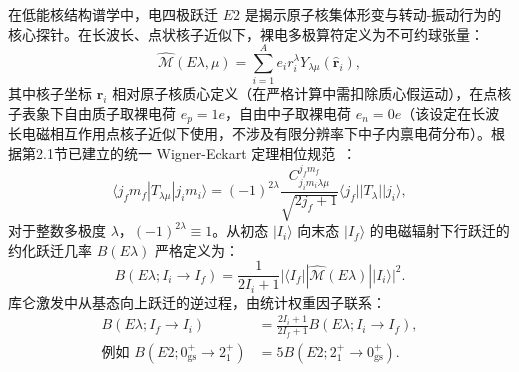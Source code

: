 在低能核结构谱学中，电四极跃迁 $E2$ 是揭示原子核集体形变与转动-振动行为的核心探针。在长波长、点状核子近似下，裸电多极算符定义为不可约球张量：
\begin{equation}\label{eq:2-7-bare-E-op}
\hat{\mathcal{M}}(E\lambda, \mu) = \sum_{i=1}^A e_i r_i^\lambda Y_{\lambda\mu}(\hat{\mathbf{r}}_i),
\end{equation}
其中核子坐标 $\mathbf{r}_i$ 相对原子核质心定义（在严格计算中需扣除质心假运动），在点核子表象下自由质子取裸电荷 $e_p = 1e$，自由中子取裸电荷 $e_n = 0e$（该设定在长波长电磁相互作用点核子近似下使用，不涉及有限分辨率下中子内禀电荷分布）。根据第2.1节已建立的统一 Wigner-Eckart 定理相位规范~\cite{book-suhonen-from-nucleons-to-nucleus}：
\begin{equation}\label{eq:2-7-wigner-eckart-phase}
\langle j_f m_f | T_{\lambda\mu} | j_i m_i \rangle = (-1)^{2\lambda} \frac{C_{j_i m_i \lambda\mu}^{j_f m_f}}{\sqrt{2j_f + 1}} \langle j_f || T_\lambda || j_i \rangle,
\end{equation}
对于整数多极度 $\lambda$，$(-1)^{2\lambda} \equiv 1$。从初态 $|I_i\rangle$ 向末态 $|I_f\rangle$ 的电磁辐射下行跃迁的约化跃迁几率 $B(E\lambda)$ 严格定义为：
\begin{equation}\label{eq:2-7-BE2-def}
B(E\lambda; I_i \to I_f) = \frac{1}{2I_i + 1} |\langle I_f || \hat{\mathcal{M}}(E\lambda) || I_i \rangle|^2.
\end{equation}
库仑激发中从基态向上跃迁的逆过程，由统计权重因子联系：
\begin{equation}\label{eq:2-7-up-down-relation}
\begin{aligned}
B(E\lambda; I_f \to I_i) &= \frac{2I_i + 1}{2I_f + 1} B(E\lambda; I_i \to I_f), \\
\text{例如 } B(E2; 0^+_{\mathrm{gs}} \to 2^+_1) &= 5 B(E2; 2^+_1 \to 0^+_{\mathrm{gs}}).
\end{aligned}
\end{equation}


